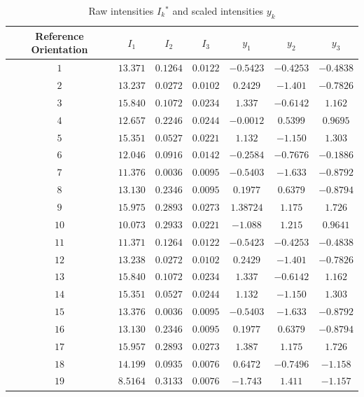 \documentclass[preprint,3p]{elsarticle}
\begin{document}
\begin{table}[h]
	\begin{center}
		\caption{\label{tab:n} Raw intensities $I_k$$^*$ and scaled intensities $y_k$}
		\begin{tabular}{|c|c|c|c|c|c|c|}
			\hline\hline
			Reference Orientation & $I_1$ &  $I_2$ &  $I_3$ & $y_1$ & $y_2$ & $y_3$ \\
			\hline
			$1$ & $13.371$ & $0.1264$ & $0.0122$ & $-0.5423$ & $-0.4253$ & $-0.4838$ \\
			$2$ & $13.237$ & $0.0272$ & $0.0102$ & $0.2429$ & $-1.401$ & $-0.7826$ \\
			$3$ & $15.840$ & $0.1072$ & $0.0234$ & $1.337$ &$-0.6142$&	$1.162$ \\
			$4$ & $12.657$ & $0.2246$ & $0.0244$ & $-0.0012$ &	$0.5399$ & $0.9695$ \\
			$5$ & $15.351$ & $0.0527$ & $0.0221$ & $1.132$ &	$-1.150$ & $1.303$ \\
			$6$ & $12.046$ & $0.0916$ & $0.0142$ & $-0.2584$ &	$-0.7676$ &	$-0.1886$ \\
			$7$ & $11.376$ & $0.0036$ & $0.0095$ & $-0.5403$ &$-1.633$ & $-0.8792$ \\
			$8$ & $13.130$ & $0.2346$ & $0.0095$ & $0.1977$ & $0.6379$ & $-0.8794$ \\
			$9$ & $15.975$ & $0.2893$ & $0.0273$ & $1.38724$ & $1.175$ & $1.726$ \\
			$10$ & $10.073$ & $0.2933$ & $0.0221$ & $-1.088$	& $1.215$ & $0.9641$ \\
			$11$ & $11.371$ & $0.1264$ & $0.0122$ & $-0.5423$ & $-0.4253$ & $-0.4838$ \\
			$12$ & $13.238$ & $0.0272$ & $0.0102$ & $0.2429$ &	$-1.401$ & $-0.7826$ \\
			$13$ & $15.840$ & $0.1072$ & $0.0234$ & $1.337$ &	$-0.6142$ & $1.162$ \\
			$14$ & $15.351$ & $0.0527$ & $0.0244$ & $1.132$ & $-1.150$ & $1.303$ \\
			$15$ & $13.376$ & $0.0036$ & $0.0095$ & $-0.5403$ & $-1.633$ & $-0.8792$ \\
			$16$ & $13.130$ & $0.2346$ & $0.0095$ & $0.1977$ & $0.6379$ & $-0.8794$ \\
			$17$ & $15.957$ & $0.2893$ & $0.0273$ & $1.387$	& $1.175$	& $1.726$ \\
			$18$ & $14.199$ & $0.0935$ & $0.0076$ & $0.6472$ & $-0.7496$ & $-1.158$ \\
			$19$ & $8.5164$ & $0.3133$ & $0.0076$ & $-1.743$ & $1.411$ & $-1.157$ \\

\end{tabular}
\end{center}
\end{table}
\end{document}
